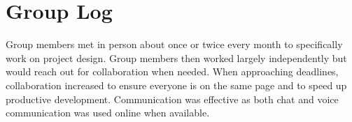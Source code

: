 
\section{Group Log}\label{sec:group-log}
    Group members met in person about once or twice every month to specifically work on project design. Group members then worked largely independently but would reach out for collaboration when needed. When approaching deadlines, collaboration increased to ensure everyone is on the same page and to speed up productive development. Communication was effective as both chat and voice communication was used online when available.

